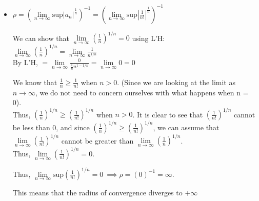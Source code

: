 \documentclass[12pt,letterpaper, onecolumn]{exam}
\newcommand{\cutelim}{\lim\limits_{n\to\infty}}
\begin{document}
\begin{questions}
\begin{solution}
\begin{itemize}
        Thus, $\rho = 1^{-1} = 1$
        \item[(c)]
        $\rho = (\lim\limits_{n\to\infty}\textrm{sup}|a_n|^{\tfrac{1}{n}})^{-1} = (\lim\limits_{n\to\infty}\textrm{sup}|\frac{1}{n!}|^{\tfrac{1}{n}})^{-1}$

        We can show that $\cutelim (\frac{1}{n})^{1/n} = 0$ using L'H: \\
         $\cutelim (\frac{1}{n})^{1/n} = \cutelim \frac{1}{n^{1/n}}$ \\
         By L'H, $= \cutelim \frac{0}{\frac{1}{n}n^{1-1/n}} = \cutelim 0 = 0$

         We know that $\frac{1}{n} \geq \frac{1}{n!}$ when $n > 0$. (Since we are looking at the limit as $n \to \infty$, we do not need to concern ourselves with what happens when n = 0). \\
         Thus, $(\frac{1}{n})^{1/n} \geq (\frac{1}{n!})^{1/n}$ when $n > 0$. It is clear to see that $(\frac{1}{n!})^{1/n}$ cannot be less than 0, and since $(\frac{1}{n})^{1/n} \geq (\frac{1}{n!})^{1/n}$, we can assume that $\cutelim (\frac{1}{n!})^{1/n}$ cannot be greater than $\cutelim(\frac{1}{n})^{1/n}$. \\
         Thus, $\cutelim (\frac{1}{n!})^{1/n} = 0$.

         Thus, $\cutelim \textrm{sup}(\frac{1}{n!})^{1/n} = 0 \: \implies \rho = (0)^{-1} = \infty$.

         This means that the radius of convergence diverges to $+ \infty $
    \end{itemize}
    \end{solution}


\end{questions}
\end{document}
